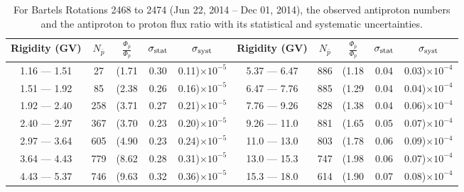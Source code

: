 \begin{table}[p] 
\renewcommand\baselinestretch{1.3}\selectfont
\setlength\tabcolsep{3pt}
\centering
\begin{tabular}{ccccc | ccccc}
\hline
\textbf{Rigidity}  (GV)  & $N_{\bar{p}}$ & $\frac{\Phi_{\bar{p}}}{\Phi_{p}}$ & $\sigma_{\rm{stat}}$ & $\sigma_{\rm{syst}}$ \hspace{1cm}   & \textbf{Rigidity}  (GV)  & $N_{\bar{p}}$ & $\frac{\Phi_{\bar{p}}}{\Phi_{p}}$ & $\sigma_{\rm{stat}}$ & $\sigma_{\rm{syst}}$ \hspace{1cm} \\ 
\hline
1.16 — 1.51   &  27                  &(1.71                          &  0.30              &      0.11)$\times 10^{-5}$  & 5.37 — 6.47                &  886                    &(1.18                                &  0.04                   &      0.03)$\times 10^{-4}$\\
1.51 — 1.92   &  85                  &(2.38                          &  0.26              &      0.16)$\times 10^{-5}$  & 6.47 — 7.76                &  885                    &(1.29                                &  0.04                   &      0.04)$\times 10^{-4}$\\
1.92 — 2.40   &  258                &(3.71                          &  0.27              &      0.21)$\times 10^{-5}$  & 7.76 — 9.26                &  828                    &(1.38                                &  0.04                   &      0.06)$\times 10^{-4}$\\    
2.40 — 2.97   &  367                &(3.70                          &  0.23              &      0.20)$\times 10^{-5}$  & 9.26 — 11.0                &  881                    &(1.65                                &  0.05                   &      0.07)$\times 10^{-4}$\\    
2.97 — 3.64   &  605                &(4.90                          &  0.23              &      0.24)$\times 10^{-5}$  & 11.0 — 13.0                 &  803                    &(1.78                                &  0.06                   &      0.09)$\times 10^{-4}$\\
3.64 — 4.43   &  779                &(8.62                          &  0.28              &      0.31)$\times 10^{-5}$  & 13.0 — 15.3               &  747                    &(1.98                                &  0.06                   &      0.07)$\times 10^{-4}$\\
4.43 — 5.37   &  746                &(9.63                          &  0.32              &      0.36)$\times 10^{-5}$  & 15.3 — 18.0               &  614                    &(1.90                                &  0.07                   &      0.08)$\times 10^{-4}$\\
\hline
\end{tabular}
\caption[Antiproton to proton flux ratio for Bartels Rotations 2468 to 2474]{For Bartels Rotations 2468 to 2474 (Jun 22, 2014 – Dec 01, 2014), the observed antiproton numbers and the antiproton to proton flux ratio with its statistical and systematic uncertainties.}
\label{TableOfDependent8}
\end{table}

